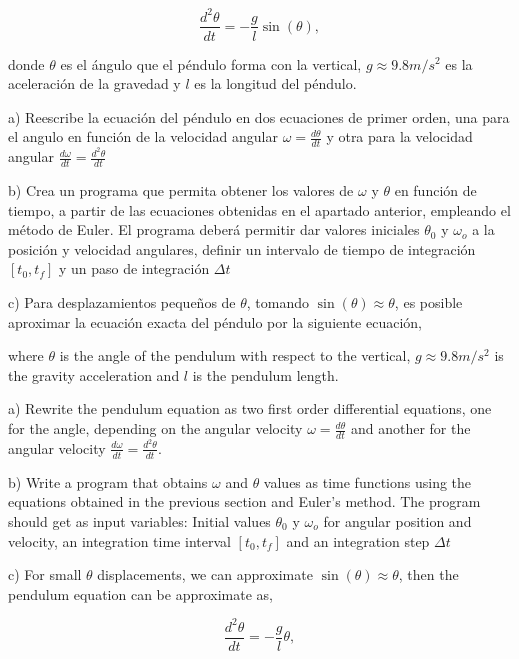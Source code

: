 \begin{equation*}
\frac{d^2\theta}{dt} =-\frac{g}{l}\sin(\theta),
\end{equation*}
\begin{paracol}{2}
donde $\theta$ es el ángulo que el péndulo forma con la vertical, $g\approx9.8 m/s^2$ es la aceleración de la gravedad y $l$ es la longitud del péndulo.

a) Reescribe la ecuación del péndulo en dos ecuaciones de primer orden, una para el angulo en función de la velocidad angular $\omega = \frac{d\theta}{dt}$ y otra para la velocidad angular $\frac{d\omega}{dt} = \frac{d^2\theta}{dt}$

b) Crea un programa que permita obtener los valores de $\omega$ y $\theta$ en función de tiempo, a partir de las ecuaciones obtenidas en el apartado anterior, empleando el método de Euler. El programa deberá permitir dar valores iniciales $\theta_0$ y $\omega_o$ a la posición y velocidad angulares, definir un intervalo de tiempo de integración $[t_0,t_f]$ y un paso de integración $\Delta t$

c) Para desplazamientos  pequeños de $\theta$, tomando $\sin(\theta) \approx \theta$, es posible aproximar  la ecuación exacta del péndulo por la siguiente ecuación,

\switchcolumn
where $\theta$ is the angle of the pendulum with respect to the vertical, $g \approx 9.8 m/s^2$ is the gravity acceleration and $l$ is the pendulum length.

a) Rewrite the pendulum equation as two first order differential equations, one for the angle, depending on the angular velocity $\omega = \frac{d\theta}{dt}$ and another for the angular velocity $\frac{d\omega}{dt} = \frac{d^2\theta}{dt}$.

b) Write a program that obtains $\omega$ and $\theta$ values as time functions using the equations obtained in the previous section and Euler's method. The program should get as input variables: Initial values $\theta_0$ y $\omega_o$  for angular position and velocity, an integration time interval $[t_0,t_f]$ and an integration step $\Delta t$

c) For small $\theta$ displacements, we can approximate $ \sin(\theta) \approx \theta$, then the pendulum equation can be approximate as,   
\end{paracol}
\begin{equation*}
\frac{d^2\theta}{dt} =-\frac{g}{l}\theta,
\end{equation*}

